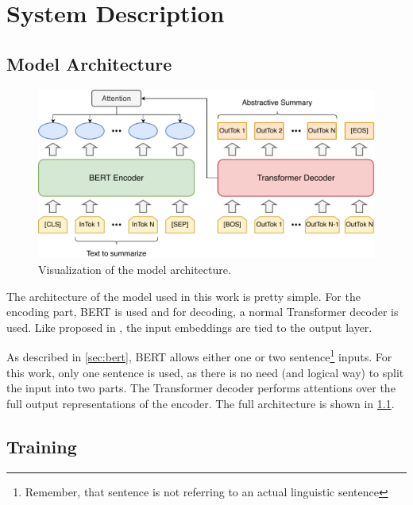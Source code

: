 \chapter{System Description}\label{ch:system-description}



\section{Model Architecture}
 
\begin{figure}[h]
\centering
\includegraphics[width=0.7\paperwidth]{figures/summarization-architecture}
\caption{Visualization of the model architecture.}
\label{fig:summarization-architecture}
\end{figure}

The architecture of the model used in this work is pretty simple.
For the encoding part, BERT is used and for decoding, a normal Transformer decoder is used.
Like proposed in \cite{1608.05859}, the input embeddings are tied to the output layer.

As described in \cref{sec:bert}, BERT allows either one or two sentence\footnote{Remember, that sentence is not referring to an actual linguistic sentence} inputs.
For this work, only one sentence is used, as there is no need (and logical way) to split the input into two parts.
The Transformer decoder performs attentions over the full output representations of the encoder.
The full architecture is shown in \cref{fig:summarization-architecture}.


\section{Training}\label{sec:system-description-training}

